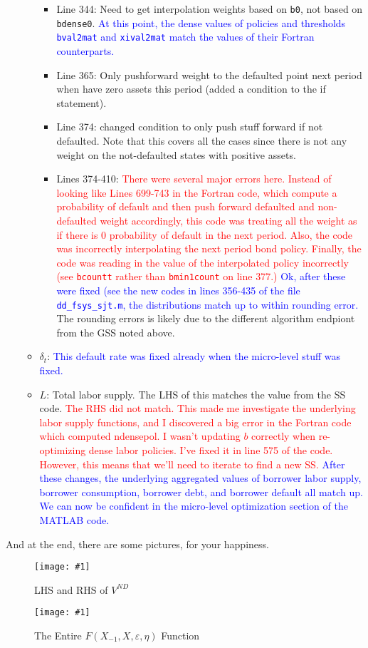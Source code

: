 \documentclass[12pt]{article}
\newcommand{\fig}[3]{\begin{figure}\begin{centering}\texttt{[image: \#1]}\caption{#2}\label{fig:#1}\end{centering}\end{figure}}
\begin{document}
\begin{itemize}
\begin{itemize}
\begin{itemize}
\item Line 344: Need to get interpolation weights based on \texttt{b0}, not based on \texttt{bdense0}. \textcolor{blue}{At this point, the dense values of policies and thresholds \texttt{bval2mat} and \texttt{xival2mat} match the values of their Fortran counterparts.}
\item Line 365: Only pushforward weight to the defaulted point next period when have zero assets this period (added a condition to the if statement).
\item Line 374: changed condition to only push stuff forward if not defaulted. Note that this covers all the cases since there is not any weight on the not-defaulted states with positive assets.
\item Lines 374-410: \textcolor{red}{There were several major errors here. Instead of looking like Lines 699-743 in the Fortran code, which compute a probability of default and then push forward defaulted and non-defaulted weight accordingly, this code was treating all the weight as if there is 0 probability of default in the next period. Also, the code was incorrectly interpolating the next period bond policy. Finally, the code was reading in the value of the interpolated policy incorrectly (see \texttt{bcountt} rather than \texttt{bmin1count} on line 377.)}  \textcolor{blue}{Ok, after these were fixed (see the new codes in lines 356-435 of the file \texttt{dd\_fsys\_sjt.m}, the distributions match up to within rounding error.} The rounding errors is likely due to the different algorithm endpiont from the GSS noted above.
\end{itemize}

\item $\delta_t$: \textcolor{blue}{This default rate was fixed already when the micro-level stuff was fixed.}

\item $L$: Total labor supply. The LHS of this matches the value from the SS code. \textcolor{red}{The RHS did not match. This made me investigate the underlying labor supply functions, and I discovered a big error in the Fortran code which computed ndensepol. I wasn't updating $b$ correctly when re-optimizing dense labor policies. I've fixed it in line 575 of the code. However, this means that we'll need to iterate to find a new SS.} \textcolor{blue}{After these changes, the underlying aggregated values of borrower labor supply, borrower consumption, borrower debt, and borrower default all match up. We can now be confident in the micro-level optimization section of the MATLAB code.}

\end{itemize}
\end{itemize}

And at the end, there are some pictures, for your happiness.

\fig{LHS_RHS_VND}{LHS and RHS of $V^{ND}$}{3.5}

\fig{Fsys}{The Entire $F(X_{-1},X,\varepsilon,\eta)$ Function}{3.5}
\end{document}
